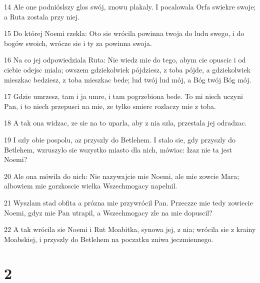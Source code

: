 \par 14 Ale one podnióslszy glos swój, znowu plakaly. I pocalowala Orfa swiekre swoje; a Ruta zostala przy niej.
\par 15 Do której Noemi rzekla: Oto sie wrócila powinna twoja do ludu swego, i do bogów swoich, wrócze sie i ty za powinna swoja.
\par 16 Na co jej odpowiedziala Ruta: Nie wiedz mie do tego, abym cie opuscic i od ciebie odejsc miala; owszem gdziekolwiek pójdziesz, z toba pójde, a gdziekolwiek mieszkac bedziesz, z toba mieszkac bede; lud twój lud mój, a Bóg twój Bóg mój.
\par 17 Gdzie umrzesz, tam i ja umre, i tam pogrzebiona bede. To mi niech uczyni Pan, i to niech przepusci na mie, ze tylko smierc rozlaczy mie z toba.
\par 18 A tak ona widzac, ze sie na to uparla, aby z nia szla, przestala jej odradzac.
\par 19 I szly obie pospolu, az przyszly do Betlehem. I stalo sie, gdy przyszly do Betlehem, wzruszylo sie wszystko miasto dla nich, mówiac: Izaz nie ta jest Noemi?
\par 20 Ale ona mówila do nich: Nie nazywajcie mie Noemi, ale mie zowcie Mara; albowiem mie gorzkoscie wielka Wszechmogacy napelnil.
\par 21 Wyszlam stad obfita a prózna mie przywrócil Pan. Przeczze mie tedy zowiecie Noemi, gdyz mie Pan utrapil, a Wszechmogacy zle na mie dopuscil?
\par 22 A tak wrócila sie Noemi i Rut Moabitka, synowa jej, z nia; wrócila sie z krainy Moabskiej, i przyszly do Betlehem na poczatku zniwa jeczmiennego.

\chapter{2}

